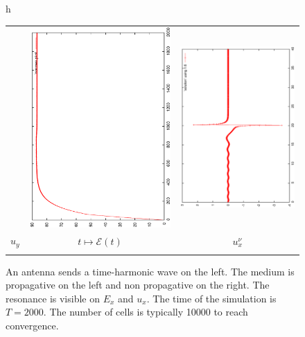 \begin{figure}{h}
\begin{center}
\begin{tabular}{ccc}
			&
			\includegraphics[angle=-90,width=5.cm]{pics_semilagrange/normes_moit.eps}
			&
			\includegraphics[angle=-90,width=5.cm]{pics_semilagrange/ux_moit.eps}
			\\      
			$u_y$ & $t\mapsto \mathcal E(t)$ & $u_x^\nu$  \\
			
			\\
			
			
		\end{tabular}   \end{center}
		\caption{An antenna sends a time-harmonic wave on the left. The medium is propagative
			on the left and non propagative
			on the right. The resonance is visible on $E_x$ and $u_x$. The time of the simulation is $T=2000$. The number of cells
			is typically 10000 to reach convergence.}
		\label{fig:vasl}
	\end{figure}



